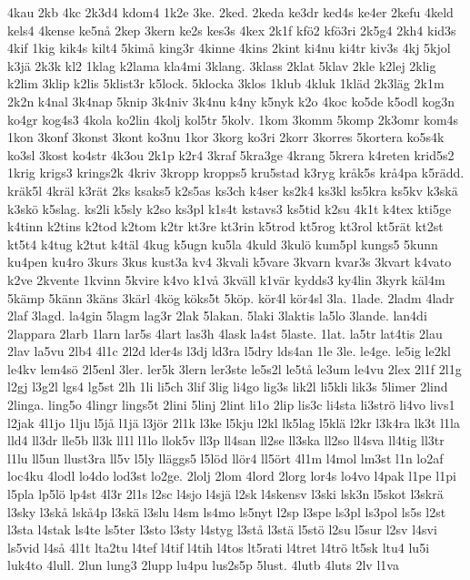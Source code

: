 {4kau
2kb
4kc
2k3d4
kdom4
1k2e
3ke.
2ked.
2keda
ke3dr
ked4s
ke4er
2kefu
4keld
kels4
4kense
ke5nå
2kep
3kern
ke2s
kes3s
4kex
2k1f
kfö2
kfö3ri
2k5g4
2kh4
kid3s
4kif
1kig
kik4s
kilt4
5kimå
king3r
4kinne
4kins
2kint
ki4nu
ki4tr
kiv3s
4kj
5kjol
k3jä
2k3k
kl2
1klag
k2lama
kla4mi
3klang.
3klass
2klat
5klav
2kle
k2lej
2klig
k2lim
3klip
k2lis
5klist3r
k5lock.
5klocka
3klos
1klub
4kluk
1kläd
2k3läg
2k1m
2k2n
k4nal
3k4nap
5knip
3k4niv
3k4nu
k4ny
k5nyk
k2o
4koc
ko5de
k5odl
kog3n
ko4gr
kog4s3
4kola
ko2lin
4kolj
kol5tr
5kolv.
1kom
3komm
5komp
2k3omr
kom4s
1kon
3konf
3konst
3kont
ko3nu
1kor
3korg
ko3ri
2korr
3korres
5kortera
ko5s4k
ko3sl
3kost
ko4str
4k3ou
2k1p
k2r4
3kraf
5kra3ge
4krang
5krera
k4reten
krid5s2
1krig
krigs3
krings2k
4kriv
3kropp
kropps5
kru5stad
k3ryg
kråk5s
krå4pa
k5rädd.
kräk5l
4kräl
k3rät
2ks
ksaks5
k2s5as
ks3ch
k4ser
ks2k4
ks3kl
ks5kra
ks5kv
k3skä
k3skö
k5slag.
ks2li
k5sly
k2so
ks3pl
k1s4t
kstavs3
ks5tid
k2su
4k1t
k4tex
kti5ge
k4tinn
k2tins
k2tod
k2tom
k2tr
kt3re
kt3rin
k5trod
kt5rog
kt3rol
kt5rät
kt2st
kt5t4
k4tug
k2tut
k4täl
4kug
k5ugn
ku5la
4kuld
3kulö
kum5pl
kungs5
5kunn
ku4pen
ku4ro
3kurs
3kus
kust3a
kv4
3kvali
k5vare
3kvarn
kvar3s
3kvart
k4vato
k2ve
2kvente
1kvinn
5kvire
k4vo
k1vå
3kväll
k1vär
kydds3
ky4lin
3kyrk
käl4m
5kämp
5känn
3käns
3kärl
4kög
köks5t
5köp.
kör4l
kör4sl
3la.
1lade.
2ladm
4ladr
2laf
3lagd.
la4gin
5lagm
lag3r
2lak
5lakan.
5laki
3laktis
la5lo
3lande.
lan4di
2lappara
2larb
1larn
lar5s
4lart
las3h
4lask
la4st
5laste.
1lat.
la5tr
lat4tis
2lau
2lav
la5vu
2lb4
4l1c
2l2d
lder4s
l3dj
ld3ra
l5dry
lds4an
1le
3le.
le4ge.
le5ig
le2kl
le4kv
lem4sö
2l5enl
3ler.
ler5k
3lern
ler3ste
le5s2l
le5tå
le3um
le4vu
2lex
2l1f
2l1g
l2gj
l3g2l
lgs4
lg5st
2lh
1li
li5ch
3lif
3lig
li4go
lig3s
lik2l
li5kli
lik3s
5limer
2lind
2linga.
ling5o
4lingr
lings5t
2lini
5linj
2lint
li1o
2lip
lis3c
li4sta
li3strö
li4vo
livs1
l2jak
4l1jo
1lju
l5jå
l1jä
l3jör
2l1k
l3ke
l5kju
l2kl
lk5lag
l5klä
l2kr
l3k4ra
lk3t
l1la
lld4
ll3dr
lle5b
ll3k
ll1l
l1lo
llok5v
ll3p
ll4san
ll2se
ll3ska
ll2so
ll4sva
ll4tig
ll3tr
l1lu
ll5un
llust3ra
ll5v
l5ly
lläggs5
l5löd
llör4
ll5ört
4l1m
l4mol
lm3st
l1n
lo2af
loc4ku
4lodl
lo4do
lod3st
lo2ge.
2lolj
2lom
4lord
2lorg
lor4s
lo4vo
l4pak
l1pe
l1pi
l5pla
lp5lö
lp4st
4l3r
2l1s
l2sc
l4sjo
l4sjä
l2sk
l4skensv
l3ski
lsk3n
l5skot
l3skrä
l3sky
l3skå
lskå4p
l3skä
l3slu
l4sm
ls4mo
ls5nyt
l2sp
l3spe
ls3pl
ls3pol
ls5s
l2st
l3sta
l4stak
ls4te
ls5ter
l3sto
l3sty
l4styg
l3stå
l3stä
l5stö
l2su
l5sur
l2sv
l4svi
ls5vid
l4så
4l1t
lta2tu
l4tef
l4tif
l4tih
l4tos
lt5rati
l4tret
l4trö
lt5sk
ltu4
lu5i
luk4to
4lull.
2lun
lung3
2lupp
lu4pu
lus2s5p
5lust.
4lutb
4luts
2lv
l1va
}
